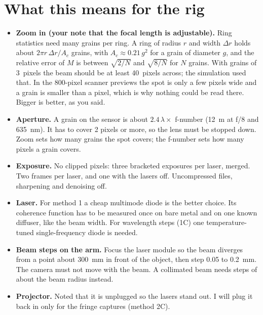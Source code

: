 \documentclass[11pt]{article}
\begin{document}
\section{What this means for the rig}\label{sec:rig}
\begin{itemize}
\item \textbf{Zoom in (your note that the focal length is adjustable).} Ring statistics need many grains per ring.
  A ring of radius $r$ and width $\Delta r$ holds about $2\pi r\,\Delta r/A_c$ grains, with $A_c\approx0.21\,g^2$ for
  a grain of diameter $g$, and the relative error of $M$ is between $\sqrt{2/N}$ and $\sqrt{8/N}$ for $N$ grains.
  With grains of 3~pixels the beam should be at least 40~pixels across; the simulation used that. In the 800-pixel
  scanner previews the spot is only a few pixels wide and a grain is smaller than a pixel, which is why nothing could
  be read there. Bigger is better, as you said.
\item \textbf{Aperture.} A grain on the sensor is about $2.4\,\lambda\times$ f-number (12~\textmu m at f/8 and
  635~nm). It has to cover 2 pixels or more, so the lens must be stopped down. Zoom sets how many grains the spot
  covers; the f-number sets how many pixels a grain covers.
\item \textbf{Exposure.} No clipped pixels: three bracketed exposures per laser, merged. Two frames per laser, and
  one with the lasers off. Uncompressed files, sharpening and denoising off.
\item \textbf{Laser.} For method 1 a cheap multimode diode is the better choice. Its coherence function has to be
  measured once on bare metal and on one known diffuser, like the beam width. For wavelength steps (1C) one
  temperature-tuned single-frequency diode is needed.
\item \textbf{Beam steps on the arm.} Focus the laser module so the beam diverges from a point about 300~mm in front
  of the object, then step 0.05 to 0.2~mm. The camera must not move with the beam. A collimated beam needs steps of
  about the beam radius instead.
\item \textbf{Projector.} Noted that it is unplugged so the lasers stand out. I will plug it back in only for the
  fringe captures (method 2C).
\end{itemize}
\end{document}
